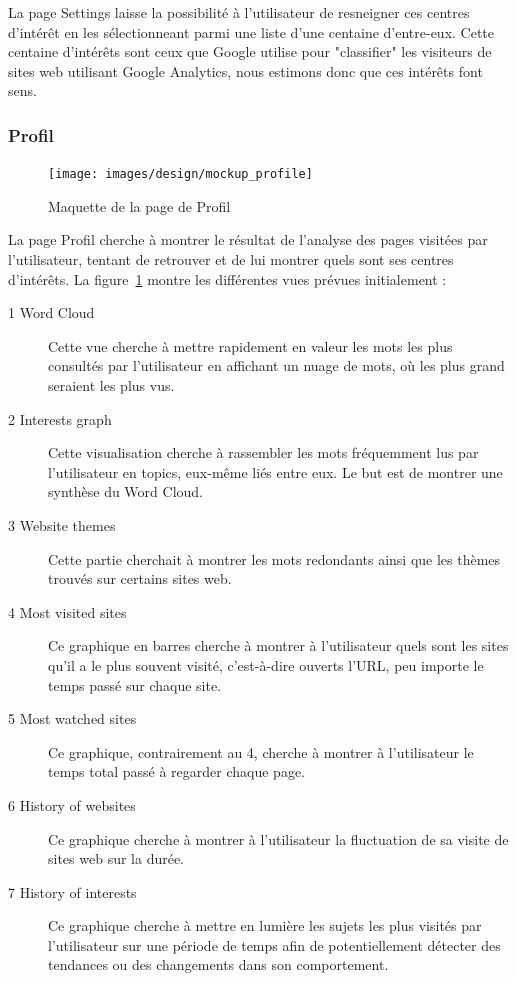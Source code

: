 			La page Settings laisse la possibilité à l'utilisateur de resneigner ces centres d'intérêt en les sélectionneant parmi une liste d'une centaine d'entre-eux. Cette centaine d'intérêts sont ceux que Google utilise pour "classifier" les visiteurs de sites web utilisant Google Analytics, nous estimons donc que ces intérêts font sens. 

		\subsubsection{Profil}

			\begin{figure}[!h]
				\centering
				\texttt{[image: images/design/mockup\_profile]}
				\caption{Maquette de la page de Profil}
				\label{d-mockup-profile}
			\end{figure}

			La page Profil cherche à montrer le résultat de l'analyse des pages visitées par l'utilisateur, tentant de retrouver et de lui montrer quels sont ses centres d'intérêts. La figure~\ref{d-mockup-profile} montre les différentes vues prévues initialement :

			\begin{description}
				\item[1 Word Cloud] Cette vue cherche à mettre rapidement en valeur les mots les plus consultés par l'utilisateur en affichant un nuage de mots, où les plus grand seraient les plus vus. 
				\item[2 Interests graph] Cette visualisation cherche à rassembler les mots fréquemment lus par l'utilisateur en topics, eux-même liés entre eux. Le but est de montrer une synthèse du Word Cloud.
				\item[3 Website themes] Cette partie cherchait à montrer les mots redondants ainsi que les thèmes trouvés sur certains sites web.
				\item[4 Most visited sites] Ce graphique en barres cherche à montrer à l'utilisateur quels sont les sites qu'il a le plus souvent visité, c'est-à-dire ouverts l'URL, peu importe le temps passé sur chaque site.
				\item[5 Most watched sites] Ce graphique, contrairement au 4, cherche à montrer à l'utilisateur le temps total passé à regarder chaque page.
				\item[6 History of websites] Ce graphique cherche à montrer à l'utilisateur la fluctuation de sa visite de sites web sur la durée.
				\item[7 History of interests] Ce graphique cherche à mettre en lumière les sujets les plus visités par l'utilisateur sur une période de temps afin de potentiellement détecter des tendances ou des changements dans son comportement.
			\end{description}

